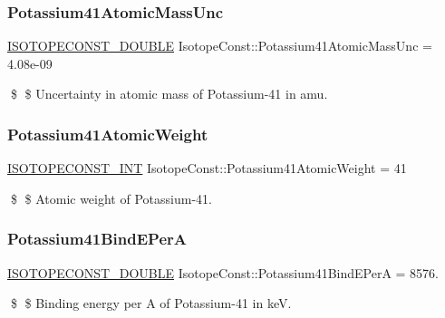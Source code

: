 \subsubsection{\texorpdfstring{Potassium41\+Atomic\+Mass\+Unc}{Potassium41AtomicMassUnc}}
{\footnotesize\ttfamily \mbox{\hyperlink{group___isotope_const-_macros_ga8f45a7272ce02c0b4c65c44636ed719a}{I\+S\+O\+T\+O\+P\+E\+C\+O\+N\+S\+T\+\_\+\+D\+O\+U\+B\+LE}} Isotope\+Const\+::\+Potassium41\+Atomic\+Mass\+Unc = 4.\+08e-\/09}

\$ \$ Uncertainty in atomic mass of Potassium-\/41 in amu. \mbox{\label{group___isotope_const-_potassium-_k41_ga1381c787de604497e20e322797754c6d}} 
\subsubsection{\texorpdfstring{Potassium41\+Atomic\+Weight}{Potassium41AtomicWeight}}
{\footnotesize\ttfamily \mbox{\hyperlink{group___isotope_const-_macros_ga5f18360b3e99483a35c32d789e62621c}{I\+S\+O\+T\+O\+P\+E\+C\+O\+N\+S\+T\+\_\+\+I\+NT}} Isotope\+Const\+::\+Potassium41\+Atomic\+Weight = 41}

\$ \$ Atomic weight of Potassium-\/41. \mbox{\label{group___isotope_const-_potassium-_k41_gadcb6c8ff6f77f0f6c0ceccee85d35fee}} 
\subsubsection{\texorpdfstring{Potassium41\+Bind\+E\+PerA}{Potassium41BindEPerA}}
{\footnotesize\ttfamily \mbox{\hyperlink{group___isotope_const-_macros_ga8f45a7272ce02c0b4c65c44636ed719a}{I\+S\+O\+T\+O\+P\+E\+C\+O\+N\+S\+T\+\_\+\+D\+O\+U\+B\+LE}} Isotope\+Const\+::\+Potassium41\+Bind\+E\+PerA = 8576.}

\$ \$ Binding energy per A of Potassium-\/41 in keV. \mbox{\label{group___isotope_const-_potassium-_k41_gac7ef16db7d3e76076410c936d5751b02}} 

